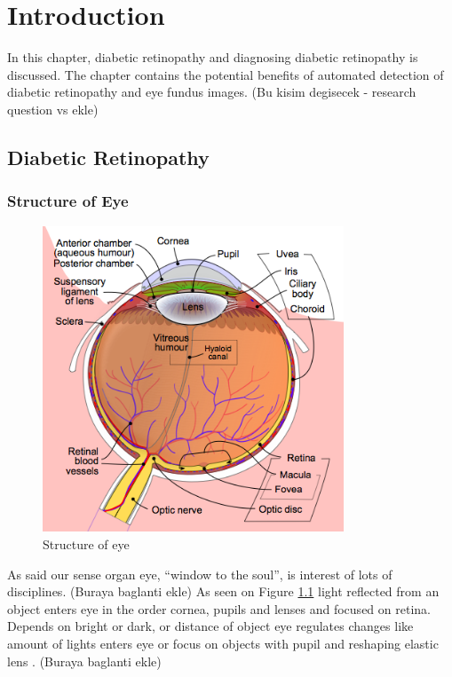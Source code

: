 \chapter{Introduction}
\label{intro}

In this chapter, diabetic retinopathy and diagnosing diabetic retinopathy is discussed. The chapter contains the potential benefits of automated detection of diabetic retinopathy and eye fundus images.  (Bu kisim degisecek - research question vs ekle)

\section{Diabetic Retinopathy}


\subsection{Structure of Eye}

\begin{figure}[t]
\centering
\includegraphics[width=0.8\textwidth]{Figures/structure_of_eye}
\caption{Structure of eye \citep{WikipediaEN:AFM}}
\label{structureOfEye}
\end{figure}

As \citet{hughes2004anatomy} said our sense organ eye, ``window to the soul'', is interest of lots of disciplines. (Buraya baglanti ekle) As seen on Figure \ref{structureOfEye} light reflected from an object enters eye in the order cornea, pupils and lenses \citep{falt2012modern} and focused on retina. Depends on bright or dark, or distance of object eye regulates changes like amount of lights enters eye or focus on objects with pupil and reshaping elastic lens \citep{kauppi2010eye}. (Buraya baglanti ekle)

